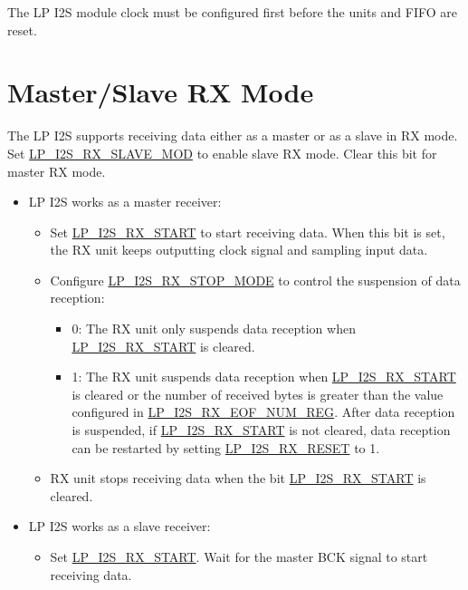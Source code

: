 \documentclass[main\_\_EN.tex]{subfiles}
\begin{document}
\begin{tiplisting}
The LP I2S module clock must be configured first before the units and FIFO are reset.
\end{tiplisting} 

\section{Master/Slave RX Mode}

The LP I2S supports receiving data either as a master or as a slave in RX mode. Set \hyperref[fielddesc:LPI2SRXSLAVEMOD]{LP\_I2S\_RX\_SLAVE\_MOD} to enable slave RX mode. Clear this bit for master RX mode.

\begin{itemize}
    \item LP I2S works as a master receiver:
    \begin{itemize}
        \item Set \hyperref[fielddesc:LPI2SRXSTART]{LP\_I2S\_RX\_START} to start receiving data. When this bit is set, the RX unit keeps outputting clock signal and sampling input data.
        \item Configure \hyperref[fielddesc:LPI2SRXSTOPMODE]{LP\_I2S\_RX\_STOP\_MODE} to control the suspension of data reception:
        \begin{itemize}
            \item 0: The RX unit only suspends data reception when \hyperref[fielddesc:LPI2SRXSTART]{LP\_I2S\_RX\_START} is cleared.
            \item 1: The RX unit suspends data reception when \hyperref[fielddesc:LPI2SRXSTART]{LP\_I2S\_RX\_START} is cleared or the number of received bytes is greater than the value configured in \hyperref[regdesc:LPI2SRXEOFNUMREG]{LP\_I2S\_RX\_EOF\_NUM\_REG}. After data reception is suspended, if \hyperref[fielddesc:LPI2SRXSTART]{LP\_I2S\_RX\_START} is not cleared, data reception can be restarted by setting \hyperref[fielddesc:LPI2SRXRESET]{LP\_I2S\_RX\_RESET} to 1.
        \end{itemize}
        \item RX unit stops receiving data when the bit \hyperref[fielddesc:LPI2SRXSTART]{LP\_I2S\_RX\_START} is cleared.
    \end{itemize}
    \item LP I2S works as a slave receiver:
    \begin{itemize}
        \item Set \hyperref[fielddesc:LPI2SRXSTART]{LP\_I2S\_RX\_START}. Wait for the master BCK signal to start receiving data.

\end{itemize}
\end{itemize}
\end{document}
